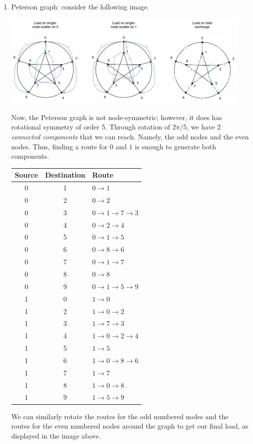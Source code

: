 \begin{parts}
\begin{solution}
\begin{enumerate}
      \item Peterson graph: consider the following image.
      \begin{center}
        \includegraphics[width=0.95\textwidth]{q3-d-2}
      \end{center}
      Now, the Peterson graph is not node-symmetric; however, it does has rotational symmetry of order 5. Through rotation of $2\pi/5$, we have 2 \emph{connected components} that we can reach. Namely, the odd nodes and the even nodes. Thus, finding a route for $0$ and $1$ is enough to generate both components.
      \begin{center}
        \begin{tabular}{ccl}
          \toprule
          Source & Destination & Route \\
          \midrule
          0 & 1 & $0 \to 1$ \\
          0 & 2 & $0 \to 2$ \\
          0 & 3 & $0 \to 1 \to 7 \to 3$ \\
          0 & 4 & $0 \to 2 \to 4$ \\
          0 & 5 & $0 \to 1 \to 5$ \\
          0 & 6 & $0 \to 8 \to 6$ \\
          0 & 7 & $0 \to 1 \to 7$ \\
          0 & 8 & $0 \to 8$ \\
          0 & 9 & $0 \to 1 \to 5 \to 9$ \\
          1 & 0 & $1 \to 0$ \\
          1 & 2 & $1 \to 0 \to 2$ \\
          1 & 3 & $1 \to 7 \to 3$ \\
          1 & 4 & $1 \to 0 \to 2 \to 4$ \\
          1 & 5 & $1 \to 5$ \\
          1 & 6 & $1 \to 0 \to 8 \to 6$ \\
          1 & 7 & $1 \to 7$ \\
          1 & 8 & $1 \to 0 \to 8$ \\
          1 & 9 & $1 \to 5 \to 9$ \\
          \bottomrule
        \end{tabular}
      \end{center}
      We can similarly rotate the routes for the odd numbered nodes and the routes for the even numbered nodes around the graph to get our final load, as displayed in the image above. 
    \end{enumerate}
  \end{solution}
\end{parts}
